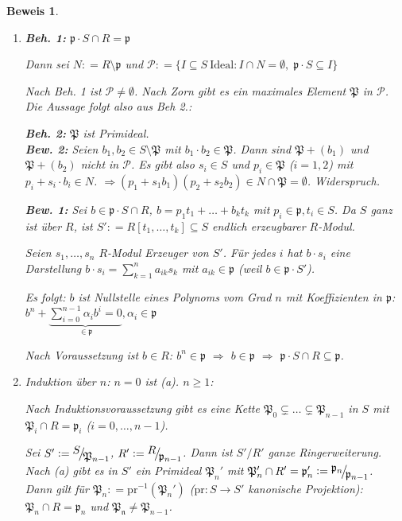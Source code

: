 \documentclass[a4paper,12pt]{scrbook}
\theoremstyle{break}
\theoremstyle{nonumberbreak}
\newtheorem{Bew}{Beweis}
\theoremstyle{nonumberplain}
\newcommand{\defeqr}[0]{\mathrel{\mathop:}=}
\newcommand{\FakRaum}[2]{
  \raisebox{0.7ex}{\ensuremath{#1}}
  \ensuremath{\mkern-3mu}\big/\ensuremath{\mkern-3mu}
  \raisebox{-0.6ex}{\ensuremath{#2}}}
\begin{document}
\begin{Bew}
\begin{enumerate}
\item \textbf{Beh. 1: } $\mathfrak{p}\cdot S \cap R =\mathfrak{p}$

Dann sei $N\defeqr R \setminus \mathfrak{p}$ und $\mathcal{P}\defeqr
\{I\subseteq S\ \text{Ideal}: I \cap N = \emptyset,\; \mathfrak{p}\cdot S \subseteq I\}$

Nach Beh. 1 ist $\mathcal{P}\neq \emptyset$. Nach Zorn gibt es ein maximales Element
$\mathfrak{P}$ in $\mathcal{P}$. Die Aussage folgt also aus Beh 2.:

\textbf{Beh. 2: } $\mathfrak{P}$ ist Primideal.\\
\textbf{Bew. 2: } Seien $b_1, b_2\in S \setminus \mathfrak{P}$ mit $b_1\cdot b_2\in \mathfrak{P}$.
Dann sind $\mathfrak{P}+(b_1)$ und $\mathfrak{P}+(b_2)$ nicht in $\mathcal{P}$. Es gibt
also $s_i\in S$ und $p_i\in \mathfrak{P}$ ($i=1,2$) mit $p_i+s_i\cdot b_i\in N$.
$\Rightarrow (p_1+s_1b_1)(p_2+s_2b_2)\in N\cap \mathfrak{P}=\emptyset$. Widerspruch.

\textbf{Bew. 1: } Sei $b\in \mathfrak{p}\cdot S\cap R$, $b=p_1t_1+\ldots+b_k t_k$ mit 
$p_i\in \mathfrak{p}, t_i\in S$. Da $S$ ganz ist über $R$, ist 
$S'\defeqr R[t_1, \ldots, t_k]\subseteq S$ endlich erzeugbarer $R$-Modul.

Seien $s_1,\ldots, s_n$ $R$-Modul Erzeuger von $S'$. Für jedes $i$ hat $b\cdot s_i$ eine
Darstellung $b\cdot s_i=\sum_{k=1}^{n}a_{ik}s_k$ mit $a_{ik}\in \mathfrak{p}$
(weil $b\in \mathfrak{p}\cdot S'$).

Es folgt: $b$ ist Nullstelle eines Polynoms vom Grad $n$ mit Koeffizienten in $\mathfrak{p}$:\\
$b^n+ \underbrace{\textstyle \sum_{i=0}^{n-1}\alpha_i b^i=0}_{\in \mathfrak{p}}, \alpha_i\in \mathfrak{p}$

Nach Voraussetzung ist $b\in R$: $b^n\in \mathfrak{p}$ $\Rightarrow$ $b\in \mathfrak{p}$
$\Rightarrow$ $\mathfrak{p}\cdot S \cap R\subseteq \mathfrak{p}$.

\item Induktion über $n$: $n=0$ ist (a). $n\geq 1$:

Nach Induktionsvoraussetzung gibt es eine Kette
$\mathfrak{P}_0\subsetneq\ldots\subsetneq\mathfrak{P}_{n-1}$
in $S$ mit $\mathfrak{P}_i\cap R=\mathfrak{p}_i$ ($i=0,\ldots, n-1$).

Sei $S'\defeqr \FakRaum{S}{\mathfrak{P}_{n-1}}$, $R' \defeqr \FakRaum{R}{\mathfrak{p}_{n-1}}$. Dann 
ist $S'/R'$ ganze Ringerweiterung.\\
Nach (a) gibt es in $S'$ ein Primideal $\mathfrak{P}_{n}'$
mit $\mathfrak{P}_n'\cap R'=\mathfrak{p}_n'\defeqr \FakRaum{\mathfrak{p}_n}{\mathfrak{p}_{n-1}}$.\\
Dann gilt für $\mathfrak{P}_n\defeqr \mbox{pr}^{-1}(\mathfrak{P}_n')$ ($\mbox{pr} : S\to S'$ kanonische Projektion):\\
$\mathfrak{P}_n \cap R=\mathfrak{p}_n$ und $\mathfrak{P_n}\neq\mathfrak{P}_{n-1}$.


\end{enumerate}
\end{Bew}
\end{document}
